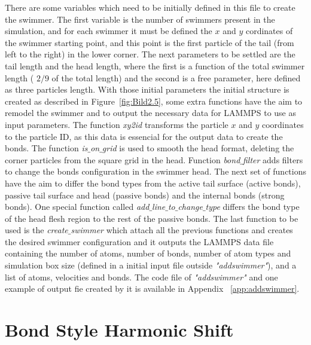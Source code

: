 There are some variables which need to be initially defined in this file to create the swimmer. The first variable is the number of swimmers present in the simulation, and for each swimmer
it must be defined the $x$ and $y$ cordinates of the swimmer starting point, and this point is the first particle of the tail (from left to the right) in the lower corner.
The next parameters to be settled are the tail length and the head length, where the first is a function of the total swimmer length ( $2/9$ of the total length) and the second is
a free parameter, here defined as three particles length. With those initial parameters the initial structure is created as described in Figure~\ref{fig:Bild2.5}, some extra functions
have the aim to remodel the swimmer and to output the necessary data for LAMMPS to use as input parameters. The function \textit{xy2id} transforms the particle $x$ and $y$ coordinates
to the particle ID, as this data is essencial for the output data to create the bonds. The function \textit{is$\_$on$\_$grid} is used to smooth the head format, deleting the corner
particles from the square grid in the head. Function \textit{bond$\_$filter} adds filters to change the bonds configuration in the swimmer head. The next set of functions have the aim
to differ the bond types from the active tail surface (active bonds), passive tail surface and head (passive bonds) and the internal bonds (strong bonds). One special function called
\textit{add$\_$line$\_$to$\_$change$\_$type} differs the bond type of the head flesh region to the rest of the passive bonds. The last function to be used is the \textit{create$\_$swimmer}
which attach all the previous functions and creates the desired swimmer configuration and it outputs the LAMMPS data file containing the number of atoms, number of bonds, number of 
atom types and simulation box size (defined in a initial input file outside \textit{"addswimmer"}), and a list of atoms, velocities and bonds. The code file of \textit{"addswimmer"}
and one example of output fie created by it is available in Appendix ~\ref{app:addswimmer}.

\section{Bond Style Harmonic Shift}
\label{sec:section 3}





 